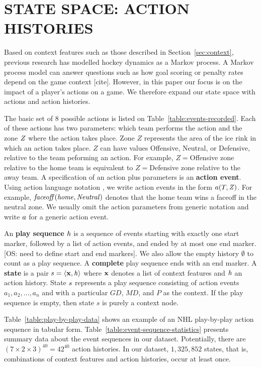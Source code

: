 \documentclass[]{article}
\begin{document}
\section{STATE SPACE: ACTION HISTORIES}

Based on context features such as those described in Section~\ref{sec:context}, previous research has modelled hockey dynamics as a Markov process. A Markov process model can answer questions such as how goal scoring or penalty rates depend on the game context [cite]. However, in this paper our focus is on the impact of a player's actions on a game. We therefore expand our state space with actions and action histories.

The basic set of 8 possible actions is listed on Table~\ref{table:events-recorded}. Each of these actions has two parameters: which team performs the action and the zone $\it{Z}$ where the action takes place. Zone $Z$ represents the area of the ice rink in which an action takes place. $Z$ can have values Offensive, Neutral, or Defensive, relative to the team peforming an action. For example, $Z=$Offensive zone relative to the home team is equivalent to $Z=$Defensive zone relative to the away team. A specification of an action plus parameters is an \textbf{action event}. Using action language notation \citep{bib:LevesquePirriReiter98}, we write action events in the form $a(T,\it{Z})$. For example, $\it{faceoff}(\it{home},\it{Neutral})$ denotes that the home team wins a faceoff in the neutral zone. We usually omit the action parameters from generic notation and write $a$ for a generic action event.

An \textbf{play sequence} $\it{h}$ is a sequence of events starting with exactly one start marker, followed by a list of action events, and ended by at most one end marker.  [OS: need to define start and end markers]. We also allow the empty history $\emptyset$ to count as a play sequence. A \textbf{complete} play sequence ends with an end marker.
A \textbf{state} is a pair $s = \langle \mathbf{x}, \it{h} \rangle$ where $\mathbf{x}$ denotes a list of context features and $\it{h}$ an action history. State $s$ represents a play sequence consisting of action events $a_1,a_2,\ldots,a_n$ and with a particular $GD$, $MD$, and $P$ as the context. If the play sequence is empty, then state $s$ is purely a context node.

Table~\ref{table:play-by-play-data} shows an example of an NHL play-by-play action sequence in tabular form. Table~\ref{table:event-sequence-statistics} presents summary data about the event sequences in our dataset. Potentially, there are $(7 \times 2 \times 3)^{40} = 42^{40}$ action histories. In our dataset, $1,325,852$ states, that is, combinations of context features and action histories, occur at least once.
\end{document}
